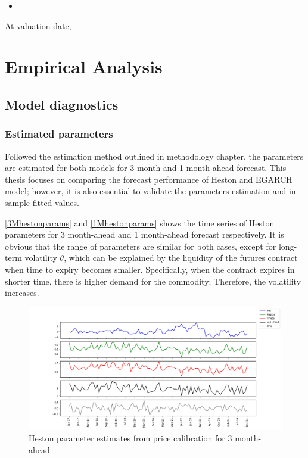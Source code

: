 \documentclass[12pt,a4paper]{article}
\newcommand\colorAutoref[1]{{\hypersetup{linkcolor=black}\autoref{#1}}}
\numberwithin{equation}{section}
\begin{document}
\begin{itemize}
\item 
\end{itemize}

At valuation date, 


\section{Empirical Analysis}

\subsection{Model diagnostics}

\subsubsection{Estimated parameters}

Followed the estimation method outlined in methodology chapter, the parameters are estimated for both models for 3-month and 1-month-ahead forecast. This thesis focuses on comparing the forecast performance of Heston and EGARCH model; however, it is also essential to validate the parameters estimation and in-sample fitted values.

 \colorAutoref{3Mhestonparams} and  \colorAutoref{1Mhestonparams} shows the time series of Heston parameters for 3 month-ahead and 1 month-ahead forecast respectively. It is obvious that the range of parameters are similar for both cases, except for long-term volatility $\theta$, which can be explained by the liquidity of the futures contract when time to expiry becomes smaller. Specifically, when the contract expires in shorter time, there is higher demand for the commodity; Therefore, the volatility increases. 


\begin{figure}[h!] 
\includegraphics[scale=1,width=1\linewidth,height=0.4\textheight]{heston_params_3m.png}
\caption{Heston parameter estimates from price calibration for 3 month-ahead}
\label{3Mhestonparams}
\end{figure}
\end{document}
